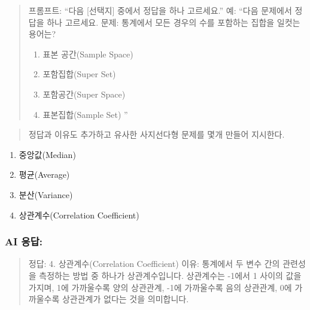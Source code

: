 \documentclass[
  letterpaper,
]{book}
\providecommand{\tightlist}{%
  \setlength{\itemsep}{0pt}\setlength{\parskip}{0pt}}\usepackage{longtable,booktabs,array}
\begin{document}
\begin{quote}
프롬프트: ``다음 {[}선택지{]} 중에서 정답을 하나 고르세요.'' 예: ``다음
문제에서 정답을 하나 고르세요. 문제: 통계에서 모든 경우의 수를 포함하는
집합을 일컷는 용어는?

\begin{enumerate}
\def\labelenumi{\arabic{enumi}.}
\tightlist
\item
  표본 공간(Sample Space)
\item
  포함집합(Super Set)
\item
  포함공간(Super Space)
\item
  표본집합(Sample Set) ''
\end{enumerate}
\end{quote}

\begin{quote}
정답과 이유도 추가하고 유사한 사지선다형 문제를 몇개 만들어 지시한다.
\end{quote}

\begin{tcolorbox}[enhanced jigsaw, opacityback=0, opacitybacktitle=0.6, colback=white, rightrule=.15mm, coltitle=black, colframe=quarto-callout-note-color-frame, colbacktitle=quarto-callout-note-color!10!white, bottomrule=.15mm, bottomtitle=1mm, breakable, title=\textcolor{quarto-callout-note-color}{\faInfo}\hspace{0.5em}{프롬프트: 통계에서 두 변수 간의 상관 관계를 나타내는 지수는?}, titlerule=0mm, leftrule=.75mm, toptitle=1mm, left=2mm, arc=.35mm, toprule=.15mm]

\begin{enumerate}
\def\labelenumi{\arabic{enumi}.}
\tightlist
\item
  중앙값(Median)
\item
  평균(Average)
\item
  분산(Variance)
\item
  상관계수(Correlation Coefficient)
\end{enumerate}

\hypertarget{ai-uxc751uxb2f5-8}{%
\subsubsection*{AI 응답:}\label{ai-uxc751uxb2f5-8}}

\begin{quote}
정답: 4. 상관계수(Correlation Coefficient) 이유: 통계에서 두 변수 간의
관련성을 측정하는 방법 중 하나가 상관계수입니다. 상관계수는 -1에서 1
사이의 값을 가지며, 1에 가까울수록 양의 상관관계, -1에 가까울수록 음의
상관관계, 0에 가까울수록 상관관계가 없다는 것을 의미합니다.
\end{quote}

\end{tcolorbox}
\end{document}
